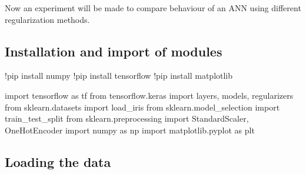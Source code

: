 \documentclass[
]{IEEEtran}
\newenvironment{Shaded}{\begin{snugshade}}{\end{snugshade}}
\newcommand{\ImportTok}[1]{\textcolor[rgb]{0.00,0.46,0.62}{#1}}
\newcommand{\NormalTok}[1]{\textcolor[rgb]{0.00,0.23,0.31}{#1}}
\newcommand{\OperatorTok}[1]{\textcolor[rgb]{0.37,0.37,0.37}{#1}}
\begin{document}
Now an experiment will be made to compare behaviour of an ANN using
different regularization methods.

\subsection{Installation and import of
modules}\label{installation-and-import-of-modules}

\begin{Shaded}
\begin{Highlighting}[]
\OperatorTok{!}\NormalTok{pip install numpy}
\OperatorTok{!}\NormalTok{pip install tensorflow}
\OperatorTok{!}\NormalTok{pip install matplotlib}
\end{Highlighting}
\end{Shaded}

\begin{Shaded}
\begin{Highlighting}[]
\ImportTok{import}\NormalTok{ tensorflow }\ImportTok{as}\NormalTok{ tf}
\ImportTok{from}\NormalTok{ tensorflow.keras }\ImportTok{import}\NormalTok{ layers, models, regularizers}
\ImportTok{from}\NormalTok{ sklearn.datasets }\ImportTok{import}\NormalTok{ load\_iris}
\ImportTok{from}\NormalTok{ sklearn.model\_selection }\ImportTok{import}\NormalTok{ train\_test\_split}
\ImportTok{from}\NormalTok{ sklearn.preprocessing }\ImportTok{import}\NormalTok{ StandardScaler, OneHotEncoder}
\ImportTok{import}\NormalTok{ numpy }\ImportTok{as}\NormalTok{ np}
\ImportTok{import}\NormalTok{ matplotlib.pyplot }\ImportTok{as}\NormalTok{ plt}
\end{Highlighting}
\end{Shaded}

\subsection{Loading the data}\label{loading-the-data}
\end{document}
